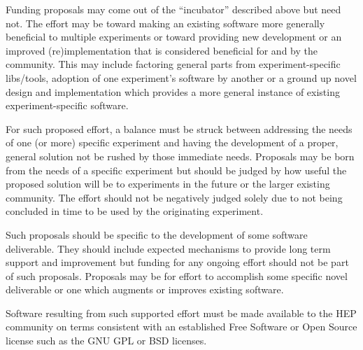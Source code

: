 Funding proposals may come out of the ``incubator'' described above but need not.
The effort may be toward making an existing software more generally
beneficial to multiple experiments
or toward providing new development or an improved (re)implementation that is 
considered beneficial for and by the community.  This may include factoring
general parts from experiment-specific libs/tools, adoption of one
experiment's software by another or a ground up novel design and
implementation which provides a more general instance of existing
experiment-specific software.

For such proposed effort, a balance must be struck between addressing
the needs of one (or more) specific experiment and having the
development of a proper, general solution not be rushed by those
immediate needs.  Proposals may be born from the needs of a specific
experiment but should be judged by how useful the proposed solution
will be to experiments in the future or the larger existing community.
The effort should not be negatively judged solely due to not being
concluded in time to be used by the originating experiment.

Such proposals should be specific to the development of some software
deliverable.  They should include expected mechanisms to provide long
term support and improvement but funding for any ongoing effort should
not be part of such proposals.  Proposals may be for effort to
accomplish some specific novel deliverable or one which augments or
improves existing software.

Software resulting from such supported effort must be made available
to the HEP community on terms consistent with an  established
Free Software or Open Source license such as the GNU GPL or BSD licenses.

